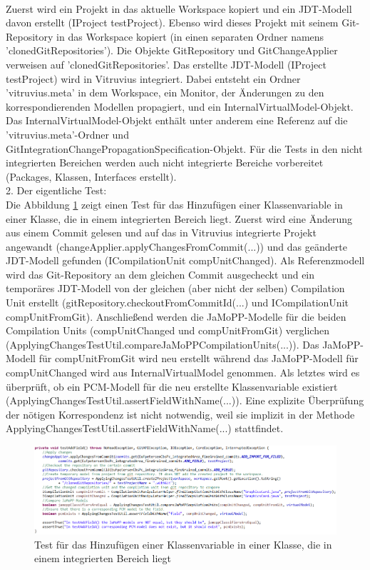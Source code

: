 \\
Zuerst wird ein Projekt in das aktuelle Workspace kopiert und ein JDT-Modell davon erstellt (IProject testProject). Ebenso wird dieses Projekt mit seinem Git-Repository in das Workspace kopiert (in einen separaten Ordner namens 'clonedGitRepositories'). Die Objekte GitRepository und GitChangeApplier verweisen auf 'clonedGitRepositories'. Das erstellte JDT-Modell (IProject testProject) wird in Vitruvius integriert. Dabei entsteht ein Ordner 'vitruvius.meta' in dem Workspace, ein Monitor, der Änderungen zu den korrespondierenden Modellen propagiert, und ein InternalVirtualModel-Objekt. Das InternalVirtualModel-Objekt enthält unter anderem eine Referenz auf die 'vitruvius.meta'-Ordner und\\GitIntegrationChangePropagationSpecification-Objekt. Für die Tests in den nicht integrierten Bereichen werden auch nicht integrierte Bereiche vorbereitet (Packages, Klassen, Interfaces erstellt).
\\
2. Der eigentliche Test:
\\
Die Abbildung \ref{fig:method} zeigt einen Test für das Hinzufügen einer Klassenvariable in einer Klasse, die in einem integrierten Bereich liegt. Zuerst wird eine Änderung  aus einem Commit gelesen und auf das in Vitruvius integrierte Projekt angewandt (changeApplier.applyChangesFromCommit(...)) und das geänderte JDT-Modell gefunden (ICompilationUnit compUnitChanged). Als Referenzmodell wird das Git-Repository an dem gleichen Commit ausgecheckt und ein temporäres JDT-Modell von der gleichen (aber nicht der selben) Compilation Unit erstellt (gitRepository.checkoutFromCommitId(...) und ICompilationUnit compUnitFromGit). Anschließend werden die JaMoPP-Modelle für die beiden Compilation Units (compUnitChanged und compUnitFromGit) verglichen (ApplyingChangesTestUtil.compareJaMoPPCompilationUnits(...)). Das JaMoPP-Modell für compUnitFromGit wird neu erstellt während das JaMoPP-Modell für compUnitChanged wird aus InternalVirtualModel genommen. Als letztes wird es überprüft, ob ein PCM-Modell für die neu erstellte Klassenvariable existiert (ApplyingChangesTestUtil.assertFieldWithName(...)). Eine explizite Überprüfung der nötigen Korrespondenz ist nicht notwendig, weil sie implizit in der Methode ApplyingChangesTestUtil.assertFieldWithName(...) stattfindet.
\begin{figure}[h]
\includegraphics[width=\textwidth]{pictures/method_example.png}
\caption{Test für das Hinzufügen einer Klassenvariable in einer Klasse, die in einem integrierten Bereich liegt}
\label{fig:method}
\end{figure}